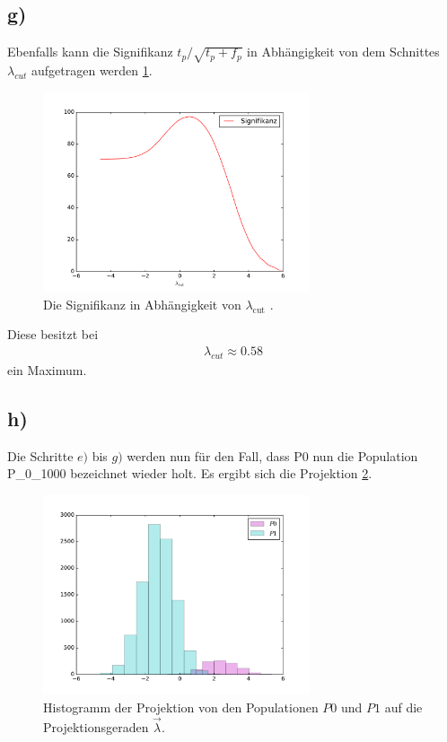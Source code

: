 \subsection{g)}
\label{subsec:a1g}
Ebenfalls kann die Signifikanz $t_p/\sqrt{t_p+f_p}$
in Abhängigkeit von dem Schnittes $\lambda_{cut}$ aufgetragen werden \ref{fig:sig}.
\begin{figure}
  \centering
  \includegraphics[width=0.7\textwidth]{Signifikanz.pdf}
  \caption{Die Signifikanz in Abhängigkeit von $\lambda_\text{cut}$ .}
  \label{fig:sig}
\end{figure}
Diese besitzt bei
\begin{align}
  \lambda_{cut}\approx0.58
\end{align}
ein Maximum.

\FloatBarrier

\subsection{h)}
\label{subsec:a1h}
Die Schritte $e)$ bis $g)$ werden nun für den Fall, dass P0 nun die Population
P\_0\_1000 bezeichnet wieder holt. Es ergibt sich die Projektion \ref{fig:proh}.

\begin{figure}
  \centering
  \includegraphics[width=0.7\textwidth]{Projektion_h).pdf}
  \caption{Histogramm der Projektion
   von den Populationen
   $P0$ und $P1$ auf die Projektionsgeraden $\vec\lambda$.}
  \label{fig:proh}
\end{figure}

